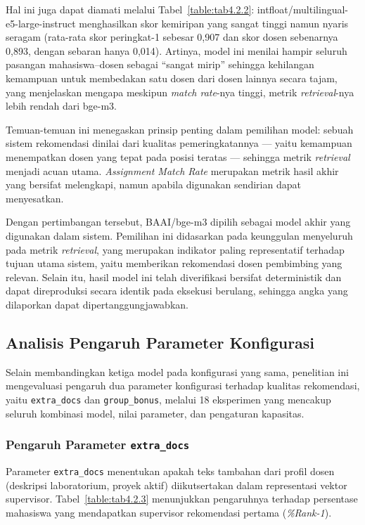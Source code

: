 Hal ini juga dapat diamati melalui Tabel~\ref{table:tab4.2.2}: intfloat/multilingual-e5-large-instruct menghasilkan skor kemiripan yang sangat tinggi namun nyaris seragam (rata-rata skor peringkat-1 sebesar 0,907 dan skor dosen sebenarnya 0,893, dengan sebaran hanya 0,014). Artinya, model ini menilai hampir seluruh pasangan mahasiswa--dosen sebagai ``sangat mirip'' sehingga kehilangan kemampuan untuk membedakan satu dosen dari dosen lainnya secara tajam, yang menjelaskan mengapa meskipun \textit{match rate}-nya tinggi, metrik \textit{retrieval}-nya lebih rendah dari bge-m3.

Temuan-temuan ini menegaskan prinsip penting dalam pemilihan model: sebuah sistem rekomendasi dinilai dari kualitas pemeringkatannya --- yaitu kemampuan menempatkan dosen yang tepat pada posisi teratas --- sehingga metrik \textit{retrieval} menjadi acuan utama. \textit{Assignment Match Rate} merupakan metrik hasil akhir yang bersifat melengkapi, namun apabila digunakan sendirian dapat menyesatkan.

Dengan pertimbangan tersebut, BAAI/bge-m3 dipilih sebagai model akhir yang digunakan dalam sistem. Pemilihan ini didasarkan pada keunggulan menyeluruh pada metrik \textit{retrieval}, yang merupakan indikator paling representatif terhadap tujuan utama sistem, yaitu memberikan rekomendasi dosen pembimbing yang relevan. Selain itu, hasil model ini telah diverifikasi bersifat deterministik dan dapat direproduksi secara identik pada eksekusi berulang, sehingga angka yang dilaporkan dapat dipertanggungjawabkan.

\subsection{Analisis Pengaruh Parameter Konfigurasi}

Selain membandingkan ketiga model pada konfigurasi yang sama, penelitian ini mengevaluasi pengaruh dua parameter konfigurasi terhadap kualitas rekomendasi, yaitu \texttt{extra\_docs} dan \texttt{group\_bonus}, melalui 18 eksperimen yang mencakup seluruh kombinasi model, nilai parameter, dan pengaturan kapasitas.

\subsubsection{Pengaruh Parameter \texttt{extra\_docs}}

Parameter \texttt{extra\_docs} menentukan apakah teks tambahan dari profil dosen (deskripsi laboratorium, proyek aktif) diikutsertakan dalam representasi vektor supervisor. Tabel~\ref{table:tab4.2.3} menunjukkan pengaruhnya terhadap persentase mahasiswa yang mendapatkan supervisor rekomendasi pertama (\textit{\%Rank-1}).

